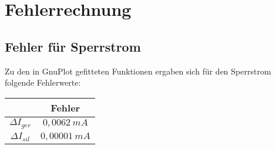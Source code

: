 \chapter{Fehlerrechnung}
\section{Fehler für Sperrstrom}
	Zu den in GnuPlot gefitteten Funktionen ergaben sich für den Sperrstrom folgende Fehlerwerte:
    \begin{center}
    \begin{tabular}{c|c}
    & Fehler\\ \hline
    $\Delta I_{ger}$ & $0,0062 ~ mA$ \\
    $\Delta I_{sil}$ & $0,00001 ~mA$ 
    \end{tabular}
    \end{center}
	\pagebreak